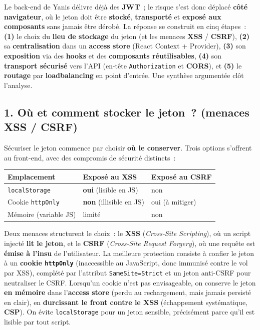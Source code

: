 \noindent Le back-end de Yanis délivre déjà des \textbf{JWT}~; le risque s'est donc déplacé \textbf{côté navigateur}, où le jeton doit être \textbf{stocké}, \textbf{transporté} et \textbf{exposé aux composants} sans jamais être dérobé. La réponse se construit en cinq étapes~: \textbf{(1)} le choix du \textbf{lieu de stockage} du jeton (et les menaces \textbf{XSS} / \textbf{CSRF}), \textbf{(2)} sa \textbf{centralisation} dans un \textbf{access store} (React Context + Provider), \textbf{(3)} son \textbf{exposition} via des \textbf{hooks} et des \textbf{composants réutilisables}, \textbf{(4)} son \textbf{transport sécurisé} vers l'API (en-tête \texttt{Authorization} et \textbf{CORS}), et \textbf{(5)} le \textbf{routage} par \textbf{loadbalancing} en point d'entrée. Une synthèse argumentée clôt l'analyse.

\vspace{0.4cm}

\subsection*{1. Où et comment stocker le jeton~? (menaces XSS / CSRF)}
{}
\noindent Sécuriser le jeton commence par choisir \textbf{où le conserver}. Trois options s'offrent au front-end, avec des compromis de sécurité distincts~:
\begin{center}
\setlength{\tabcolsep}{6pt}
\begin{tabular}{|l|l|l|}
\hline
\textbf{Emplacement} & \textbf{Exposé au XSS} & \textbf{Exposé au CSRF} \\ \hline
\texttt{localStorage} & \textbf{oui} (lisible en JS) & non \\ \hline
Cookie \texttt{httpOnly} & \textbf{non} (illisible en JS) & oui (à mitiger) \\ \hline
Mémoire (variable JS) & limité & non \\ \hline
\end{tabular}
\end{center}
\noindent Deux menaces structurent le choix~: le \textbf{XSS} (\textit{Cross-Site Scripting}), où un script injecté \textbf{lit le jeton}, et le \textbf{CSRF} (\textit{Cross-Site Request Forgery}), où une requête est \textbf{émise à l'insu} de l'utilisateur. La meilleure protection consiste à confier le jeton à un \textbf{cookie \texttt{httpOnly}} (inaccessible au JavaScript, donc immunisé contre le vol par XSS), complété par l'attribut \texttt{SameSite=Strict} et un jeton anti-CSRF pour neutraliser le CSRF. Lorsqu'un cookie n'est pas envisageable, on conserve le jeton \textbf{en mémoire} dans l'\textbf{access store} (perdu au rechargement, mais jamais persisté en clair), en \textbf{durcissant le front contre le XSS} (échappement systématique, \textbf{CSP}). On évite \texttt{localStorage} pour un jeton sensible, précisément parce qu'il est lisible par tout script.

